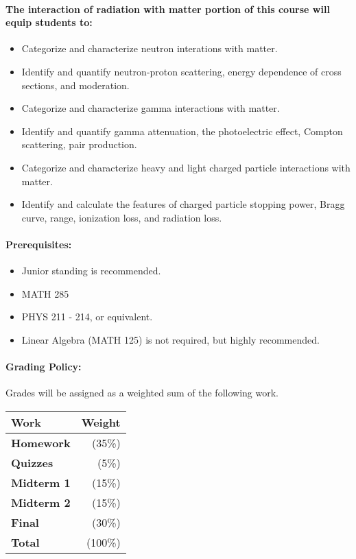\documentclass[11pt]{article}
\begin{document}
\paragraph{The interaction of radiation with matter portion of this course will equip 
students to:} 
\begin{itemize}
        \item Categorize and characterize neutron interations with matter. 
        \item Identify and quantify neutron-proton scattering, energy 
                dependence of cross sections, and moderation.
        \item Categorize and characterize gamma interactions with matter.
        \item Identify and quantify gamma attenuation, the photoelectric 
                effect, Compton scattering, pair production.
        \item Categorize and characterize heavy and light charged particle 
                interactions with matter.
        \item Identify and calculate the features of charged particle stopping 
                power, Bragg curve, range, ionization loss, and radiation loss.
\end{itemize}

\paragraph{Prerequisites:} 
\begin{itemize}
        \item Junior standing is recommended.
        \item MATH 285
        \item PHYS 211 - 214, or equivalent.
        \item Linear Algebra (MATH 125) is not required, but highly recommended.
\end{itemize}

\paragraph{Grading Policy:} Grades will be assigned as a weighted sum of the following work. 

\begin{table}[h]
\begin{tabularx}{\textwidth}{Xr}
\textbf{Work} & \textbf{Weight}\\
\hline
\textbf{Homework} & (35\%) \\
\textbf{Quizzes} & (5\%) \\
\textbf{Midterm 1} & (15\%) \\
\textbf{Midterm 2} & (15\%) \\
\textbf{Final} & (30\%) \\
\hline
\textbf{Total} & (100\%) \\
\end{tabularx}
\end{table}
\end{document}
